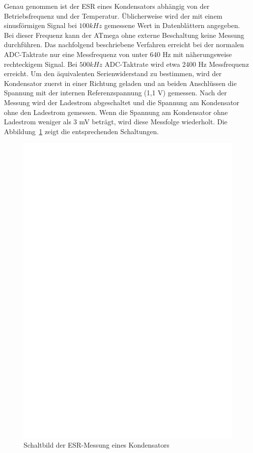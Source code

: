 Genau genommen ist der ESR eines Kondensators abhängig von der Betriebsfrequenz und der Temperatur.
Üblicherweise wird der mit einem sinusförmigen Signal bei \(100 kHz\) gemessene Wert in Datenblättern angegeben.
Bei dieser Frequenz kann der ATmega ohne externe Beschaltung keine Messung durchführen.
Das nachfolgend beschriebene Verfahren erreicht bei der normalen ADC-Taktrate nur eine Messfrequenz von unter 640 Hz
 mit näherungsweise rechteckigem Signal. Bei \(500 kHz\) ADC-Taktrate wird etwa 2400 Hz Messfrequenz erreicht.
Um den äquivalenten Serienwiderstand zu bestimmen,
 wird der Kondensator zuerst in einer Richtung geladen und an beiden Anschlüssen die Spannung mit der internen
Referenzspannung (1,1 V) gemessen.
Nach der Messung wird der Ladestrom abgeschaltet und die Spannung am Kondensator ohne den
Ladestrom gemessen. Wenn die Spannung am Kondensator ohne Ladestrom weniger als 3 mV beträgt, wird
diese Messfolge wiederholt.
Die Abbildung~\ref{fig:Cap_esr} zeigt die entsprechenden Schaltungen.

\begin{figure}[H]
  \centering
    \includegraphics[]{../FIG/Cap_esr.eps}
  \caption{Schaltbild der ESR-Messung eines Kondensators}
  \label{fig:Cap_esr}
\end{figure}

